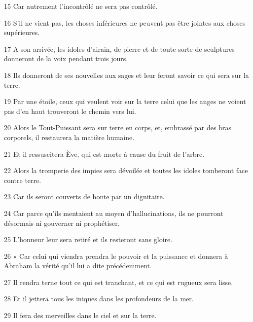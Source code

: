\par 15 Car autrement l'incontrôlé ne sera pas contrôlé.

\par 16 S'il ne vient pas, les choses inférieures ne peuvent pas être jointes aux choses supérieures.

\par 17 A son arrivée, les idoles d'airain, de pierre et de toute sorte de sculptures donneront de la voix pendant trois jours.

\par 18 Ils donneront de ses nouvelles aux sages et leur feront savoir ce qui sera sur la terre.

\par 19 Par une étoile, ceux qui veulent voir sur la terre celui que les anges ne voient pas d'en haut trouveront le chemin vers lui.

\par 20 Alors le Tout-Puissant sera sur terre en corps, et, embrassé par des bras corporels, il restaurera la matière humaine.

\par 21 Et il ressuscitera Ève, qui est morte à cause du fruit de l'arbre.

\par 22 Alors la tromperie des impies sera dévoilée et toutes les idoles tomberont face contre terre.

\par 23 Car ils seront couverts de honte par un dignitaire.

\par 24 Car parce qu'ils mentaient au moyen d'hallucinations, ils ne pourront désormais ni gouverner ni prophétiser.

\par 25 L'honneur leur sera retiré et ils resteront sans gloire.

\par 26 « Car celui qui viendra prendra le pouvoir et la puissance et donnera à Abraham la vérité qu'il lui a dite précédemment.

\par 27 Il rendra terne tout ce qui est tranchant, et ce qui est rugueux sera lisse.

\par 28 Et il jettera tous les iniques dans les profondeurs de la mer.

\par 29 Il fera des merveilles dans le ciel et sur la terre.

